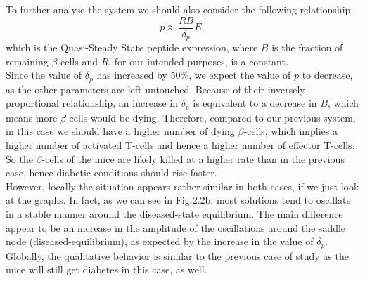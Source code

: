 To further analyse the system we should also consider the following relationship
$$
p \approx \frac{RB}{\delta_{p}}E,
$$
which is the Quasi-Steady State peptide expression, where $B$ is the fraction of remaining $\beta$-cells and $R$, for our intended purposes, is a constant.\\
Since the value of $\delta_{p}$ has increased by 50\%, we expect the value of $p$ to decrease, as the other parameters are left untouched. Because of their inversely proportional relationship, an increase in $\delta_{p}$ is equivalent to a decrease in $B$, which means more $\beta$-cells would be dying. Therefore, compared to our previous system, in this case we should have a higher number of dying $\beta$-cells, which implies a higher number of activated T-cells and hence a higher number of effector T-cells. So the $\beta$-cells of the mice are likely killed at a higher rate than in the previous case, hence diabetic conditions should rise faster.\\
However, locally the situation appears rather similar in both cases, if we just look at the graphs. In fact, as we can see in Fig.2.2b, most solutions tend to oscillate in a stable manner around the diseased-state equilibrium. The main difference appear to be an increase in the amplitude of the oscillations around the saddle node (diseased-equilibrium), as expected by the increase in the value of $\delta_{p}$.\\
Globally, the qualitative behavior is similar to the previous case of study as the mice will still get diabetes in this case, as well.

